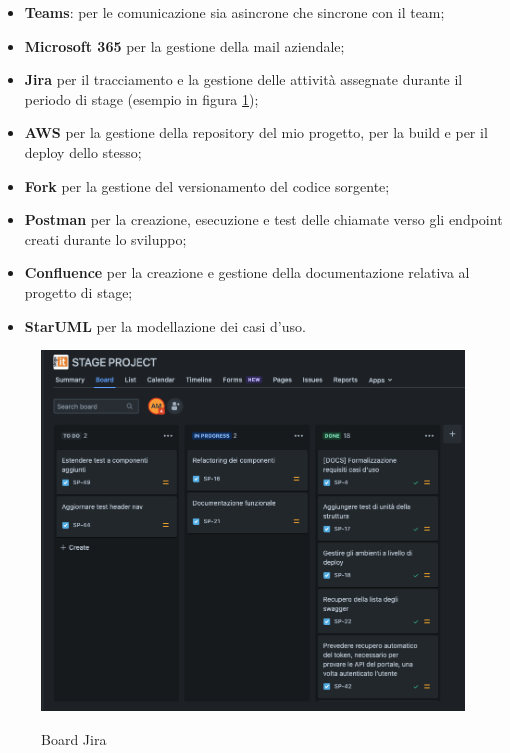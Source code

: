\begin{itemize}
  \item \textbf{Teams}: per le comunicazione sia asincrone che sincrone con il team;
  \item \textbf{Microsoft 365} per la gestione della mail aziendale;
  \item \textbf{Jira} per il tracciamento e la gestione delle attività assegnate durante il periodo di stage (esempio in figura \ref{fig:board-jira});
  \item \textbf{AWS} per la gestione della repository del mio progetto, per la build e per il deploy dello stesso;
  \item \textbf{Fork} per la gestione del versionamento del codice sorgente;
  \item \textbf{Postman} per la creazione, esecuzione e test delle chiamate verso gli endpoint creati durante lo sviluppo;
  \item \textbf{Confluence} per la creazione e gestione della documentazione relativa al progetto di stage;
  \item \textbf{StarUML} per la modellazione dei casi d'uso.
\end{itemize}

\begin{figure}[!ht] 
  \centering 
  \includegraphics[width=0.9\columnwidth, alt={Esempio di utilizzo della board di Jira}]{images/Board.jpg}
  \caption{Board Jira}\label{fig:board-jira}
\end{figure}

